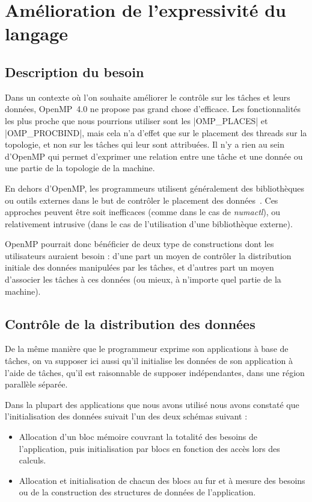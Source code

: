 \section{Amélioration de l'expressivité du langage}\label{sec:openmp:langage}

\subsection{Description du besoin}

Dans un contexte où l'on souhaite améliorer le contrôle sur les tâches et leurs données, OpenMP~4.0 ne propose pas grand chose d'efficace.
Les fonctionnalités les plus proche que nous pourrions utiliser sont les |OMP_PLACES| et |OMP_PROCBIND|, mais cela n'a d'effet que sur le placement des threads sur la topologie, et non sur les tâches qui leur sont attribuées. Il n'y a rien au sein d'OpenMP qui permet d'exprimer une relation entre une tâche et une donnée ou une partie de la topologie de la machine.

En dehors d'OpenMP, les programmeurs utilisent généralement des bibliothèques ou outils externes dans le but de contrôler le placement des données~\cite{Pousa2009, Broquedis2010a}.
Ces approches peuvent être soit inefficaces (comme dans le cas de \emph{numactl}), ou relativement intrusive (dans le cas de l'utilisation d'une bibliothèque externe).

OpenMP pourrait donc bénéficier de deux type de constructions dont les utilisateurs auraient besoin : d'une part un moyen de contrôler la distribution initiale des données manipulées par les tâches, et d'autres part un moyen d'associer les tâches à ces données (ou mieux, à n'importe quel partie de la machine).

\subsection{Contrôle de la distribution des données}\label{sec:openmp:langage:init}

De la même manière que le programmeur exprime son applications à base de tâches, on va supposer ici aussi qu'il initialise les données de son application à l'aide de tâches, qu'il est raisonnable de supposer indépendantes, dans une région parallèle séparée.

Dans la plupart des applications que nous avons utilisé nous avons constaté que l'initialisation des données suivait l'un des deux schémas suivant :
\begin{itemize}
    \item Allocation d'un bloc mémoire couvrant la totalité des besoins de l'application, puis initialisation par blocs en fonction des accès lors des calculs.
  \item Allocation et initialisation de chacun des blocs au fur et à mesure des besoins ou de la construction des structures de données de l'application.
\end{itemize}

